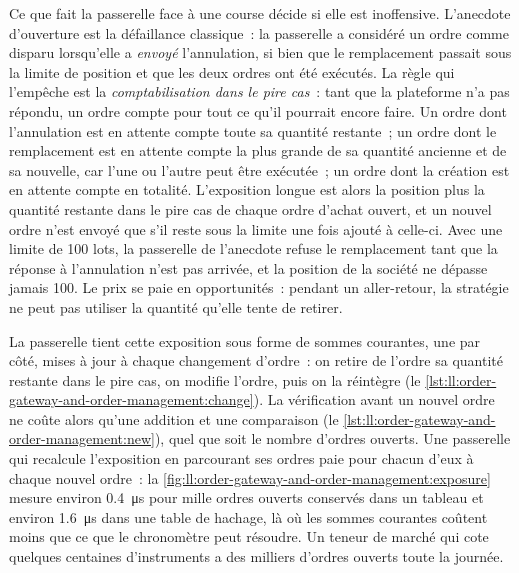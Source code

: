 Ce que fait la passerelle face à une course décide si elle est inoffensive. L'anecdote d'ouverture est la défaillance classique~: la passerelle a considéré
un ordre comme disparu lorsqu'elle a \emph{envoyé} l'annulation, si bien que le remplacement passait sous la limite de position et que les deux ordres ont été exécutés. La règle
qui l'empêche est la \emph{comptabilisation dans le pire cas}~: tant que la plateforme n'a pas répondu, un ordre compte pour tout ce qu'il pourrait encore
faire. Un ordre dont l'annulation est en attente compte toute sa quantité restante~; un ordre dont le remplacement est en attente compte la plus grande de sa quantité ancienne et de sa
nouvelle, car l'une ou l'autre peut être exécutée~; un ordre dont la création est en attente compte en totalité. L'exposition longue est alors la position plus la
quantité restante dans le pire cas de chaque ordre d'achat ouvert, et un nouvel ordre n'est envoyé que s'il reste sous la limite une fois ajouté à celle-ci. Avec une
limite de 100 lots, la passerelle de l'anecdote refuse le remplacement tant que la réponse à l'annulation n'est pas arrivée, et la position de la société ne
dépasse jamais 100. Le prix se paie en opportunités~: pendant un aller-retour, la stratégie ne peut pas utiliser la quantité qu'elle tente
de retirer.

La passerelle tient cette exposition sous forme de sommes courantes, une par côté, mises à jour à chaque changement d'ordre~: on retire de l'ordre sa
quantité restante dans le pire cas, on modifie l'ordre, puis on la réintègre (le \cref{lst:ll:order-gateway-and-order-management:change}). La vérification
avant un nouvel ordre ne coûte alors qu'une addition et une comparaison (le \cref{lst:ll:order-gateway-and-order-management:new}), quel que soit
le nombre d'ordres ouverts. Une passerelle qui recalcule l'exposition en parcourant ses ordres paie pour chacun d'eux à chaque
nouvel ordre~: la \cref{fig:ll:order-gateway-and-order-management:exposure} mesure environ \qty{0.4}{\micro\second} pour mille
ordres ouverts conservés dans un tableau et environ \qty{1.6}{\micro\second} dans une table de hachage, là où les sommes courantes coûtent moins que
ce que le chronomètre peut résoudre. Un teneur de marché qui cote quelques centaines d'instruments a des milliers d'ordres ouverts toute la journée.

\label{lst:ll:order-gateway-and-order-management:change}

